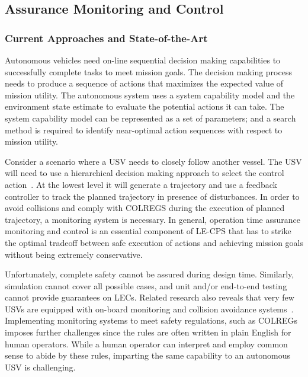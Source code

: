 




\subsection{Assurance Monitoring and Control}

\subsubsection{Current Approaches and State-of-the-Art}

Autonomous vehicles need on-line sequential decision making capabilities to successfully complete tasks to meet mission goals. The decision making process needs to produce a sequence of actions that maximizes the expected value of mission utility. The autonomous system uses a system capability model and the environment state estimate to evaluate the potential actions it can take. The system capability model can be represented as a set of parameters; and a search method is required to identify near-optimal action sequences with respect to mission utility.

Consider a scenario where a USV needs to closely follow another vessel. The USV will need to use a hierarchical decision making approach to select the control action~\cite{Shah2016,Bertaska2015,Raboin2015,svec2012automated,svectarget2013,thakur2012}. At the lowest level it will generate a trajectory and use a feedback controller to track the planned trajectory in presence of disturbances. In order to avoid collisions and comply with COLREGS during the execution of planned trajectory, a monitoring  system is necessary. In general, operation time assurance monitoring and control is an essential component of LE-CPS that has to strike the optimal tradeoff between safe execution of actions and achieving mission goals without being extremely conservative.

Unfortunately, complete safety cannot be assured during design time. Similarly, simulation cannot cover all possible cases, and unit and/or end-to-end testing cannot provide guarantees on LECs. Related research also reveals that very few USVs are equipped with on-board monitoring and collision avoidance systems~\cite{naeem2010automatic}. Implementing monitoring systems to meet safety regulations, such as COLREGs imposes further challenges since the rules are often written in plain English for human operators. While a human operator can interpret and employ common sense to abide by these rules, imparting the same capability to an autonomous USV is challenging. 

